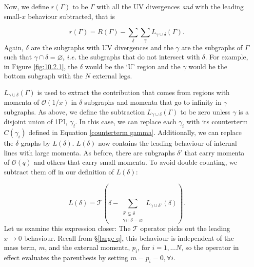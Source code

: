 \documentclass{article}
\begin{document}
Now, we define $r(\Gamma)$ to be $\Gamma$ with all the UV divergences \textit{and} with the leading small-$x$ behaviour subtracted, that is

\begin{equation} \label{small_r}
    r(\Gamma) = R(\Gamma) - \sum_\delta \sum_\gamma L_{\gamma \cup \delta}(\Gamma).
\end{equation}
Again, $\delta$ are the subgraphs with UV divergences and the $\gamma$ are the subgraphs of $\Gamma$ such that $\gamma\cap\delta=\varnothing$, \textit{i.e.} the subgraphs that do not intersect with $\delta$. For example, in Figure \ref{fig:10.2.1}, the $\delta$ would be the `U' region and the $\gamma$ would be the bottom subgraph with the $N$ external legs. 

$L_{\gamma\cup\delta}(\Gamma)$ is used to extract the contribution that comes from regions with momenta of $\mathcal{O}(1/x)$ in $\delta$ subgraphs and momenta that go to infinity in $\gamma$ subgraphs. As above, we define the subtraction $L_{\gamma\cup\delta}(\Gamma)$ to be zero unless $\gamma$ is a disjoint union of 1PI, $\gamma_i$. In this case, we can replace each $\gamma_i$ with its counterterm $C(\gamma_i)$ defined in Equation \ref{counterterm gamma}. Additionally, we can replace the $\delta$ graphs by $L(\delta)$. $L(\delta)$ now contains the leading behaviour of internal lines with large momenta. As before, there are subgraphs $\delta'$ that carry momenta of $\mathcal{O}(q)$ and others that carry small momenta. To avoid double counting, we subtract them off in our definition of $L(\delta)$:

\begin{equation} \label{largeQ_recursion}
    L(\delta) = \mathcal{T} \left( \delta - \sum_{\substack{\delta'\varsubsetneq \delta \\ \gamma\cap\delta = \varnothing }} L_{\gamma\cup\delta'}(\delta) \right).
\end{equation}
Let us examine this expression closer:  The $\mathcal{T}$ operator picks out the leading $x\rightarrow 0$ behaviour. Recall from \S\ref{large q}, this behaviour is independent of the mass term, $m$, and the external momenta, $p_i$, for $i=1,\dots N$, so the operator in effect evaluates the parenthesis by setting $m=p_i=0, \forall i$.
\end{document}
